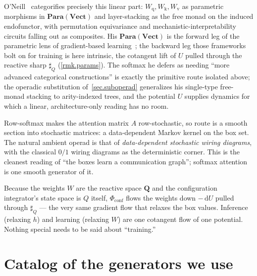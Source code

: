 \documentclass[11pt]{article}
\theoremstyle{plain}
\theoremstyle{definition}
\theoremstyle{remark}
\newcommand{\Cat}[1]{\mathbf{#1}}
\newcommand{\vect}{\Cat{Vect}}
\newcommand{\rv}[1]{\mathbf{#1}}         %
\newcommand{\sharpR}{\sharp}
\newcommand{\conf}{\mathrm{conf}}
\newcommand{\Phiconf}{\Phi_{\conf}}
\newcommand{\Wq}{W_{\mathrm q}}
\newcommand{\Wk}{W_{\mathrm k}}
\newcommand{\Wv}{W_{\mathrm v}}
\begin{document}
\begin{remark}\label{rmk.oneill}
O'Neill~\cite{ONeill} categorifies precisely this linear part: $\Wq,\Wk,\Wv$
as parametric morphisms in $\Cat{Para}(\vect)$ and layer-stacking as the free
monad on the induced endofunctor, with permutation equivariance and
mechanistic-interpretability circuits falling out as composites. His
$\Cat{Para}(\vect)$ is the forward leg of the parametric lens of gradient-based
learning~\cite{CGGWZ}; the backward leg those frameworks bolt on for training is
here intrinsic, the cotangent lift of $U$ pulled through the reactive sharp
$\sharpR_Q$ (\cref{rmk.params}). The softmax he
defers as needing ``more advanced categorical constructions'' is exactly the
primitive $\mathrm{route}$ isolated above; the operadic substitution
of~\cref{sec.suboperad} generalizes his single-type free-monad stacking to
arity-indexed trees, and the potential $U$ supplies dynamics for which a linear,
architecture-only reading has no room.
\end{remark}

\begin{remark}\label{rmk.stoch}
Row-softmax makes the attention matrix $A$ row-stochastic, so
$\mathrm{route}$ is a smooth section into stochastic matrices: a
data-dependent Markov kernel on the box set. The natural ambient operad is
that of \emph{data-dependent stochastic wiring diagrams}, with the
classical $0/1$ wiring diagrams as the deterministic corner. This is the
cleanest reading of ``the boxes learn a communication graph''; softmax
attention is one smooth generator of it.
\end{remark}

\begin{remark}\label{rmk.params}
Because the weights $W$ are the reactive space $\rv Q$ and the
configuration integrator's state space is $Q$ itself, $\Phiconf$ flows the
weights down $-\,\mathrm dU$ pulled through $\sharpR_Q$ --- the very same
gradient flow that relaxes the box values. Inference (relaxing $h$) and
learning (relaxing $W$) are one cotangent flow of one potential. Nothing
special needs to be said about ``training.''
\end{remark}

\section{Catalog of the generators we use}\label{sec.catalog}
\end{document}
